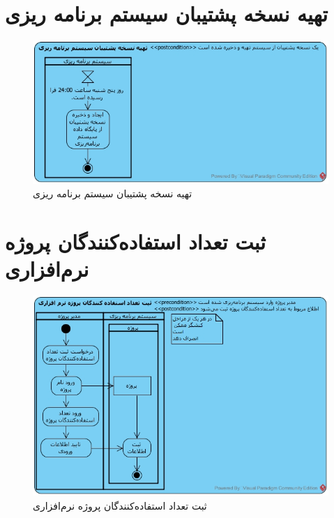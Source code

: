 \section{تهیه نسخه پشتیبان سیستم برنامه ریزی}
\begin{figure}[H]
	\centering
	\includegraphics[scale=0.8]{img/activity/Support}
	\caption{تهیه نسخه پشتیبان سیستم برنامه ریزی}
\end{figure}

\section{ثبت تعداد استفاده‌کنندگان پروژه نرم‌افزاری}
\begin{figure}[H]
	\centering
	\includegraphics[scale=0.7]{img/activity/AddUsersCount}
	\caption{ثبت تعداد استفاده‌کنندگان پروژه نرم‌افزاری}
\end{figure}


